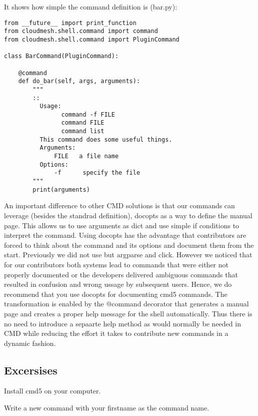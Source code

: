 It shows how simple the command definition is (bar.py):

\begin{verbatim}
from __future__ import print_function
from cloudmesh.shell.command import command
from cloudmesh.shell.command import PluginCommand

class BarCommand(PluginCommand):

    @command
    def do_bar(self, args, arguments):
        """
        ::
          Usage:
                command -f FILE
                command FILE
                command list
          This command does some useful things.
          Arguments:
              FILE   a file name
          Options:
              -f      specify the file
        """
        print(arguments)
\end{verbatim}

An important difference to other CMD solutions is that our commands can
leverage (besides the standrad definition), docopts as a way to define
the manual page. This allows us to use arguments as dict and use simple
if conditions to interpret the command. Using docopts has the advantage
that contributors are forced to think about the command and its options
and document them from the start. Previously we did not use but argparse
and click. However we noticed that for our contributors both systems
lead to commands that were either not properly documented or the
developers delivered ambiguous commands that resulted in confusion and
wrong ussage by subsequent users. Hence, we do recommend that you use
docopts for documenting cmd5 commands. The transformation is enabled by
the @command decorator that generates a manual page and creates a proper
help message for the shell automatically. Thus there is no need to
introduce a sepaarte help method as would normally be needed in CMD
while reducing the effort it takes to contribute new commands in a
dynamic fashion.

\subsection{Excersises}

\begin{exercise}
\label{E:CMD5.1:}
Install cmd5 on your computer.
\end{exercise}

\begin{exercise}
\label{E:CMD5.2:}
Write a new command with your firstname as the command name.
\end{exercise}

